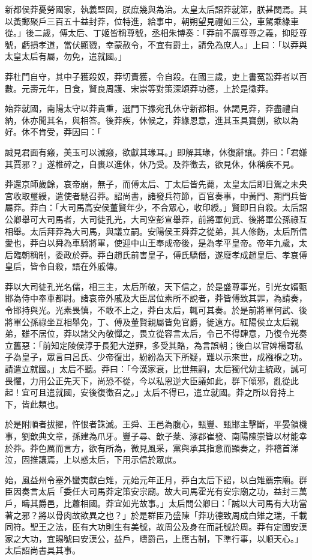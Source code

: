 \begin{pinyinscope}
新都侯莽憂勞國家，執義堅固，朕庶幾與為治。太皇太后詔莽就第，朕甚閔焉。其以黃郵聚戶三百五十益封莽，位特進，給事中，朝朔望見禮如三公，車駕乘綠車從。」後二歲，傅太后、丁姬皆稱尊號，丞相朱博奏：「莽前不廣尊尊之義，抑貶尊號，虧損孝道，當伏顯戮，幸蒙赦令，不宜有爵土，請免為庶人。」上曰：「以莽與太皇太后有屬，勿免，遣就國。」

莽杜門自守，其中子獲殺奴，莽切責獲，令自殺。在國三歲，吏上書冤訟莽者以百數。元壽元年，日食，賢良周護、宋崇等對策深頌莽功德，上於是徵莽。

始莽就國，南陽太守以莽貴重，選門下掾宛孔休守新都相。休謁見莽，莽盡禮自納，休亦聞其名，與相答。後莽疾，休候之，莽緣恩意，進其玉具寶劍，欲以為好。休不肯受，莽因曰：「

誠見君面有瘢，美玉可以滅瘢，欲獻其瑑耳。」即解其瑑，休復辭讓。莽曰：「君嫌其賈邪？」遂椎碎之，自裹以進休，休乃受。及莽徵去，欲見休，休稱疾不見。

莽還京師歲餘，哀帝崩，無子，而傅太后、丁太后皆先薨，太皇太后即日駕之未央宮收取璽綬，遣使者馳召莽。詔尚書，諸發兵符節，百官奏事，中黃門、期門兵皆屬莽。莽白：「大司馬高安侯董賢年少，不合眾心，收印綬。」賢即日自殺。太后詔公卿舉可大司馬者，大司徒孔光，大司空彭宣舉莽，前將軍何武、後將軍公孫祿互相舉。太后拜莽為大司馬，與議立嗣。安陽侯王舜莽之從弟，其人修飭，太后所信愛也，莽白以舜為車騎將軍，使迎中山王奉成帝後，是為孝平皇帝。帝年九歲，太后臨朝稱制，委政於莽。莽白趙氏前害皇子，傅氏驕僭，遂廢孝成趙皇后、孝哀傅皇后，皆令自殺，語在外戚傳。

莽以大司徒孔光名儒，相三主，太后所敬，天下信之，於是盛尊事光，引光女婿甄邯為侍中奉車都尉。諸哀帝外戚及大臣居位素所不說者，莽皆傅致其罪，為請奏，令邯持與光。光素畏慎，不敢不上之，莽白太后，輒可其奏。於是前將軍何武、後將軍公孫祿坐互相舉免，丁、傅及董賢親屬皆免官爵，徙遠方。紅陽侯立太后親弟，雖不居位，莽以諸父內敬憚之，畏立從容言太后，令己不得肆意，乃復令光奏立舊惡：「前知定陵侯淳于長犯大逆罪，多受其賂，為言誤朝；後白以官婢楊寄私子為皇子，眾言曰呂氏、少帝復出，紛紛為天下所疑，難以示來世，成襁褓之功。請遣立就國。」太后不聽。莽曰：「今漢家衰，比世無嗣，太后獨代幼主統政，誠可畏懼，力用公正先天下，尚恐不從，今以私恩逆大臣議如此，群下傾邪，亂從此起！宜可且遣就國，安後復徵召之。」太后不得已，遣立就國。莽之所以脅持上下，皆此類也。

於是附順者拔擢，忤恨者誅滅。王舜、王邑為腹心，甄豐、甄邯主擊斷，平晏領機事，劉歆典文章，孫建為爪牙。豐子尋、歆子棻、涿郡崔發、南陽陳崇皆以材能幸於莽。莽色厲而言方，欲有所為，微見風采，黨與承其指意而顯奏之，莽稽首涕泣，固推讓焉，上以惑太后，下用示信於眾庶。

始，風益州令塞外蠻夷獻白雉，元始元年正月，莽白太后下詔，以白雉薦宗廟。群臣因奏言太后「委任大司馬莽定策安宗廟。故大司馬霍光有安宗廟之功，益封三萬戶，疇其爵邑，比蕭相國。莽宜如光故事。」太后問公卿曰：「誠以大司馬有大功當著之邪？將以骨肉故欲異之也？」於是群臣乃盛陳「莽功德致周成白雉之瑞，千載同符。聖王之法，臣有大功則生有美號，故周公及身在而託號於周。莽有定國安漢家之大功，宜賜號曰安漢公，益戶，疇爵邑，上應古制，下準行事，以順天心。」太后詔尚書具其事。


\end{pinyinscope}
